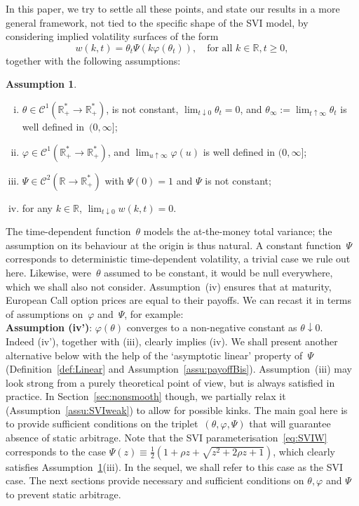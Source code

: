 \documentclass{amsart}[11pt]
\numberwithin{equation}{section}
\theoremstyle{definition}
\newtheorem{assumption}[theorem]{Assumption}
\newcommand{\RR}{\mathbb{R}}
\newcommand{\Cc}{\mathcal{C}}
\begin{document}
In this paper, we try to settle all these points, and state our results in a more general framework, 
not tied to the specific shape of the SVI model, 
by considering implied volatility surfaces of the form
\begin{equation}\label{eq:GenSVI}
w(k,t)=\theta_t\Psi(k \varphi(\theta_t)),
\quad\text{for all }k\in\RR, t\geq 0,
\end{equation}
together with the following assumptions:
\begin{assumption}\label{assu:SVI}\text{}
\begin{enumerate}[(i)]
\item $\theta \in \Cc^1(\RR_+^*\to \RR_+^*)$, is not constant, 
$\lim_{t\downarrow 0} \theta_t = 0$, and $\theta_\infty:=\lim_{t\uparrow\infty}\theta_t$ is well defined in~$(0,\infty]$;
\item $\varphi \in \Cc^1(\RR_+^*\to \RR_+^*)$, 
and $\lim_{u\uparrow\infty}\varphi(u)$ 
is well defined in $(0,\infty]$;
\item $\Psi \in \Cc^2(\RR\to \RR_+^*)$
with $\Psi(0)=1$ and $\Psi$ is not constant;
\item for any $k\in\RR$, $\lim_{t\downarrow 0}w(k,t) =0$.
\end{enumerate}
\end{assumption}
The time-dependent function~$\theta$ models the at-the-money total variance; 
the assumption on its behaviour at the origin is thus natural. 
A constant function~$\Psi$ corresponds to deterministic time-dependent volatility, 
a trivial case we rule out here.
Likewise, were~$\theta$ assumed to be constant, it would be null everywhere, 
which we shall also not consider.
Assumption~(iv) ensures that at maturity, European Call option prices are equal to their payoffs. 
We can recast it in terms of assumptions on~$\varphi$ and~$\Psi$, for example:\\
\textbf{Assumption (iv')}: $\varphi(\theta)$ converges to a non-negative constant as $\theta\downarrow 0$.\\
Indeed (iv'), together with (iii), clearly implies (iv).
We shall present another alternative below with the help of the `asymptotic linear' property of~$\Psi$ 
(Definition~\ref{def:Linear} and Assumption~\ref{assu:payoffBis}).
Assumption~(iii) may look strong from a purely theoretical point of view, but is always satisfied in practice.
In Section~\ref{sec:nonsmooth} though, we partially relax it (Assumption~\ref{assu:SVIweak}) 
to allow for possible kinks.
The main goal here is to provide sufficient conditions on the triplet~$(\theta, \varphi, \Psi)$ that will guarantee absence of static arbitrage.
Note that the SVI parameterisation~\eqref{eq:SVIW}
corresponds to the case $\Psi(z)\equiv \frac{1}{2} (1+\rho z +\sqrt{z^2+2\rho z+1})$,
which clearly satisfies Assumption~\ref{assu:SVI}(iii).
In the sequel, we shall refer to this case as the SVI case.
The next sections provide necessary and sufficient conditions on $\theta, \varphi$ and $\Psi$ 
to prevent static arbitrage.
\end{document}
